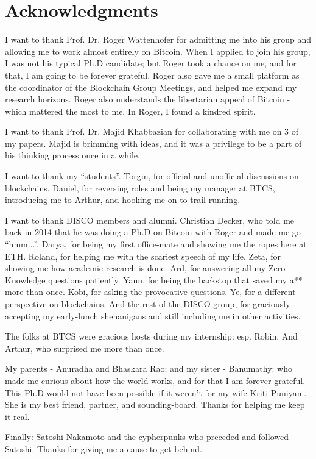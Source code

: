 \chapter*{Acknowledgments}

I want to thank Prof. Dr. Roger Wattenhofer for admitting me into his group and allowing me to work almost entirely on Bitcoin. When I applied to join his group, I was not his typical Ph.D candidate; but Roger took a chance on me, and for that, I am going to be forever grateful. Roger also gave me a small platform as the coordinator of the Blockchain Group Meetings, and helped me expand my research horizons. Roger also understands the libertarian appeal of Bitcoin - which mattered the most to me. In Roger, I found a kindred spirit. 

I want to thank Prof. Dr. Majid Khabbazian for collaborating with me on 3 of my papers. Majid is brimming with ideas, and it was a privilege to be a part of his thinking process once in a while.

I want to thank my ``students''. Torgin, for official and unofficial discussions on blockchains. Daniel, for reversing roles and being my manager at BTCS, introducing me to Arthur, and hooking me on to trail running. 

I want to thank DISCO members and alumni. Christian Decker, who told me back in 2014 that he was doing a Ph.D on Bitcoin with Roger and made me go ``hmm...''. Darya, for being my first office-mate and showing me the ropes here at ETH. Roland, for helping me with the scariest speech of my life. Zeta, for showing me how academic research is done. Ard, for answering all my Zero Knowledge questions patiently. Yann, for being the backstop that saved my a** more than once. Kobi, for asking the provocative questions. Ye, for a different perspective on blockchains. And the rest of the DISCO group, for graciously accepting my early-lunch shenanigans and still including me in other activities.

The folks at BTCS were gracious hosts during my internship: esp. Robin. And Arthur, who surprised me more than once.

My parents - Anuradha and Bhaskara Rao; and my sister - Banumathy: who made me curious about how the world works, and for that I am forever grateful. This Ph.D would not have been possible if it weren't for my wife Kriti Puniyani. She is my best friend, partner, and sounding-board. Thanks for helping me keep it real.

Finally: Satoshi Nakamoto and the cypherpunks who preceded and followed Satoshi. Thanks for giving me a cause to get behind.

